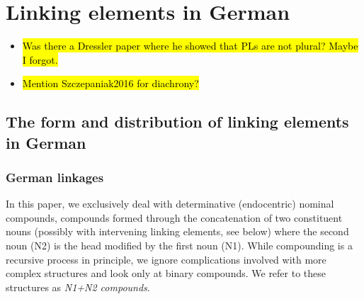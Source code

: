 \section{Linking elements in German}
\label{sec:linkingelementsingerman}

\begin{itemize}
  \item \hl{Was there a Dressler paper where he showed that PLs are not plural? Maybe I forgot.}
  \item \hl{Mention Szczepaniak2016 for diachrony?}
\end{itemize}

\subsection{The form and distribution of linking elements in German}
\label{sec:theformanddistributionoflinkingelementsingerman}

\subsubsection{German linkages}

In this paper, we exclusively deal with determinative (endocentric) nominal compounds, \ie compounds formed through the concatenation of two constituent nouns (possibly with intervening linking elements, see below) where the second noun (N2) is the head modified by the first noun (N1).
While compounding is a recursive process in principle, we ignore complications involved with more complex structures and look only at binary compounds.
We refer to these structures as \textit{N1+N2 compounds}.

